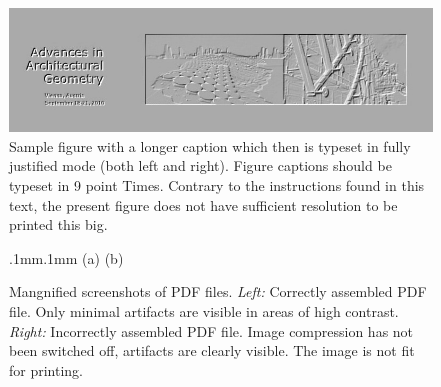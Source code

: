 \documentclass[twoside]{article}
\begin{document}
\begin{figure}[p]
	\includegraphics[width=\textwidth]{images/image1}
	\caption{Sample figure with a longer caption which then is
typeset in fully justified mode (both left and right). Figure captions 
should be typeset in 9 point Times. Contrary to the instructions found in 
this text, the present figure does not have sufficient resolution to be 
printed this big.}
 \end{figure}

\begin{figure}[p]
	\fboxsep.1mm\fboxrule.1mm
	(a)\hfill{}
	\hfill
	(b)\hfill{}
	\caption{Mangnified screenshots of PDF files.
{\em Left:} Correctly assembled PDF file. Only minimal artifacts are
visible in areas of high contrast.
{\em Right:} Incorrectly assembled PDF file. Image compression has
not been switched off, artifacts are clearly visible.
The image is not fit for printing.}
	\label{fig:artifacts}
\end{figure}
\end{document}
